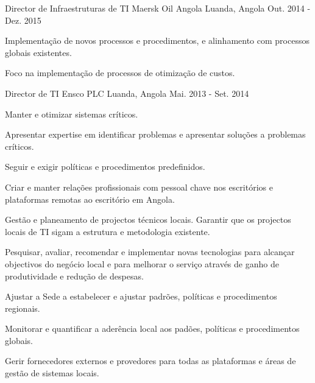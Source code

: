 \begin{cventries}

\cventry
{Director de Infraestruturas de TI} %
{Maersk Oil Angola} %
{Luanda, Angola} %
{Out. 2014 - Dez. 2015} %
{ %
\begin{cvitems}
\item {Implementação de novos processos e procedimentos, e alinhamento com processos globais existentes.}
\item {Foco na implementação de processos de otimização de custos.}
\end{cvitems}
}


\cventry
{Director de TI} %
{Ensco PLC} %
{Luanda, Angola} %
{Mai. 2013 - Set. 2014} %
{ %
\begin{cvitems}
\item {Manter e otimizar sistemas críticos.}
\item {Apresentar expertise em identificar problemas e apresentar soluções a problemas críticos.}
\item {Seguir e exigir políticas e procedimentos predefinidos.}
\item {Criar e manter relações profissionais com pessoal chave nos escritórios e plataformas remotas ao escritório em Angola.}
\item {Gestão e planeamento de projectos técnicos locais. Garantir que os projectos locais de TI sigam a estrutura e metodologia existente.}
\item {Pesquisar, avaliar, recomendar e implementar novas tecnologias para alcançar objectivos do negócio local e para melhorar o serviço através de ganho de produtividade e redução de despesas.}
\item {Ajustar a Sede a estabelecer e ajustar padrões, políticas e procedimentos regionais.}
\item {Monitorar e quantificar a aderência local aos padões, políticas e procedimentos globais.}
\item {Gerir fornecedores externos e provedores para todas as plataformas e áreas de gestão de sistemas locais.}
\end{cvitems}
}



\end{cventries}
